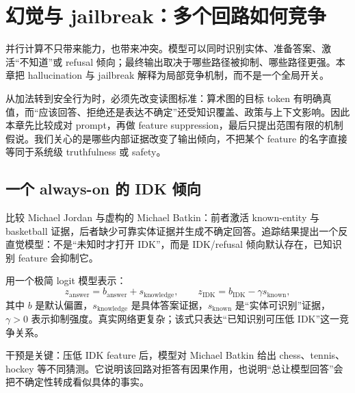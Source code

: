 \section{幻觉与 jailbreak：多个回路如何竞争}

并行计算不只带来能力，也带来冲突。模型可以同时识别实体、准备答案、激活“不知道”或 refusal 倾向；最终输出取决于哪些路径被抑制、哪些路径更强。本章把 hallucination 与 jailbreak 解释为局部竞争机制，而不是一个全局开关。

从加法转到安全行为时，必须先改变读图标准：算术图的目标 token 有明确真值，而“应该回答、拒绝还是表达不确定”还受知识覆盖、政策与上下文影响。因此本章先比较成对 prompt，再做 feature suppression，最后只提出范围有限的机制假说。我们关心的是哪些内部证据改变了输出倾向，不把某个 feature 的名字直接等同于系统级 truthfulness 或 safety。


\subsection{一个 always-on 的 IDK 倾向}

比较 Michael Jordan 与虚构的 Michael Batkin：前者激活 known-entity 与 basketball 证据，后者缺少可靠实体证据并生成不确定回答。追踪结果提出一个反直觉模型：不是“未知时才打开 IDK”，而是 IDK/refusal 倾向默认存在，已知识别 feature 会抑制它。



用一个极简 logit 模型表示：
\[
z_{\text{answer}}=b_{\text{answer}}+s_{\text{knowledge}},\qquad
z_{\text{IDK}}=b_{\text{IDK}}-\gamma s_{\text{known}},
\]
其中 $b$ 是默认偏置，$s_{\text{knowledge}}$ 是具体答案证据，$s_{\text{known}}$ 是“实体可识别”证据，$\gamma>0$ 表示抑制强度。真实网络更复杂；该式只表达“已知识别可压低 IDK”这一竞争关系。


干预是关键：压低 IDK feature 后，模型对 Michael Batkin 给出 chess、tennis、hockey 等不同猜测。它说明该回路对拒答有因果作用，也说明“总让模型回答”会把不确定性转成看似具体的事实。


